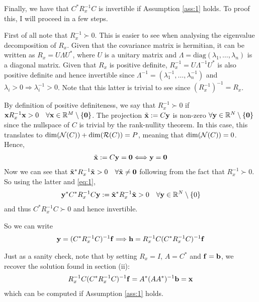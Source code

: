 \documentclass{article}
\begin{document}
\begin{enumerate}[label=(\roman*)]
        Finally, we have that $C^* R_x^{-1} C$ is invertible if Assumption \ref{ass:1} holds. To proof this, I will proceed in a few steps.
        
        First of all note that $R_x^{-1} \succ 0$. This is easier to see when analysing the eigenvalue decomposition of $R_x$. Given that the covariance matrix is hermitian, it can be written as $R_x = U \Lambda U^*$, where $U$ is a unitary matrix and $\Lambda = \text{diag}(\lambda_1,\dots, \lambda_n)$ is a diagonal matrix. Given that $R_x$ is positive definite, $R_x^{-1} = U \Lambda^{-1} U^*$ is also positive definite and hence invertible since $\Lambda^{-1} = (\lambda_1^{-1},\dots, \lambda_n^{-1})$ and $\lambda_i > 0 \Longrightarrow \lambda_i^{-1} > 0$. Note that this latter is trivial to see since $(R_x^{-1})^{-1}=R_x$.
        
        By definition of positive definiteness, we say that $R_x^{-1}\succ 0$ if $\mathbf{x} R_x^{-1} \mathbf{x} > 0\quad \forall \mathbf{x} \in \mathbb{R}^M \setminus \{\mathbf{0}\}$. The projection $\tilde{\mathbf{x}} := C \mathbf{y}$ is non-zero $\forall \mathbf{y} \in \mathbb{R}^N \setminus \{\mathbf{0}\}$ since the nullspace of $C$ is trivial by the rank-nullity theorem. In this case, this translates to $\dim(\mathcal{N}(C))+ \dim(\mathcal{R}(C))=P$, meaning that $\dim(\mathcal{N}(C))=0$. Hence,
        \begin{align}
        \tilde{\mathbf{x}}  := C \mathbf{y} = \mathbf{0} \Longleftrightarrow \mathbf{y} = \mathbf{0} \label{eq:1}
        \end{align}
        Now we can see that $\tilde{\mathbf{x}}^* R_x^{-1} \tilde{\mathbf{x}} > 0\quad \forall \tilde{\mathbf{x}} \neq \mathbf{0}$ following from the fact that $R_x^{-1} \succ 0$. So using the latter and \eqref{eq:1},
        \begin{align}
        \mathbf{y}^* C^* R_x^{-1} C \mathbf{y}:=\tilde{\mathbf{x}}^* R_x^{-1} \tilde{\mathbf{x}} > 0\quad \forall \mathbf{y} \in \mathbb{R}^N \setminus \{0\}
        \end{align}
        and thus $C^* R_x^{-1} C \succ 0$ and hence invertible.
        
        So we can write
        \begin{align}
            \mathbf{y} = (C^* R_x^{-1} C)^{-1} \mathbf{f} \Longrightarrow \mathbf{h} = R_x^{-1} C (C^* R_x^{-1} C)^{-1} \mathbf{f}
        \end{align}
        
        Just as a sanity check, note that by setting $R_x = I$, $A = C^*$ and $\mathbf{f} = \mathbf{b}$, we recover the solution found in section (ii):
        \begin{align}
            R_x^{-1} C (C^* R_x^{-1} C)^{-1} \mathbf{f} = A^* (A A^*)^{-1} \mathbf{b} = \mathbf{x}
        \end{align}
        which can be computed if Assumption \ref{ass:1} holds.
        

\end{enumerate}
\end{document}

